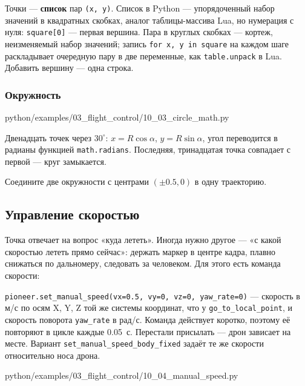 Точки --- \textbf{список} пар \verb|(x, y)|. Список в Python --- упорядоченный набор значений в квадратных скобках, аналог таблицы-массива Lua, но нумерация с нуля: \verb|square[0]| --- первая вершина. Пара в круглых скобках --- кортеж, неизменяемый набор значений; запись \verb|for x, y in square| на каждом шаге раскладывает очередную пару в две переменные, как \verb|table.unpack| в Lua. Добавить вершину --- одна строка.

\subsubsection*{Окружность}

\begin{codefile}[python]{python/examples/03_flight_control/10_03_circle_math.py}
\end{codefile}

Двенадцать точек через $30^\circ$: $x = R\cos\alpha$, $y = R\sin\alpha$, угол переводится в радианы функцией \verb|math.radians|. Последняя, тринадцатая точка совпадает с первой --- круг замыкается.

\begin{taskbox}[Восьмёрка]
Соедините две окружности с центрами $(\pm 0.5, 0)$ в одну траекторию.
\end{taskbox}

\subsection{Управление скоростью}
\label{sec:python-manual-speed}

Точка отвечает на вопрос «куда лететь». Иногда нужно другое --- «с какой скоростью лететь прямо сейчас»: держать маркер в центре кадра, плавно снижаться по дальномеру, следовать за человеком. Для этого есть команда скорости:

\begin{codebox}
\verb|pioneer.set_manual_speed(vx=0.5, vy=0, vz=0, yaw_rate=0)| --- скорость в м/с по осям X, Y, Z той же системы координат, что у \verb|go_to_local_point|, и скорость поворота \verb|yaw_rate| в рад/с. Команда действует коротко, поэтому её повторяют в цикле каждые 0.05~с. Перестали присылать --- дрон зависает на месте. Вариант \verb|set_manual_speed_body_fixed| задаёт те же скорости относительно носа дрона.
\end{codebox}

\begin{codefile}[python]{python/examples/03_flight_control/10_04_manual_speed.py}
\end{codefile}

